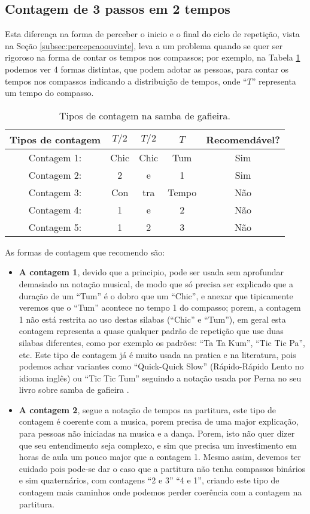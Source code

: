 \subsection{Contagem de 3 passos em 2 tempos}
Esta diferença na forma de perceber o inicio e o final do ciclo de repetição,
vista na Seção \ref{subsec:percepcaoouvinte}, 
leva a um problema quando se quer ser rigoroso na forma de contar os tempos nos compassos; 
por exemplo, na Tabela \ref{tab:ritmo1} 
podemos ver 4 formas distintas, que podem adotar as pessoas, 
para contar os tempos nos compassos indicando a distribuição de tempos, 
onde ``$T$'' representa um tempo do compasso.
\begin{table}[ht]
  \centering
  \begin{tabular}    {c|ccc|c}
    \hline
    Tipos de contagem       & $T/2$ & $T/2$   & $T$ & Recomendável?\\
    \hline
    Contagem 1: & Chic  & Chic  & Tum   & Sim\\
    Contagem 2: & 2     & e     & 1     & Sim\\ \hline
    Contagem 3: & Con   & tra  & Tempo & Não\\
    Contagem 4: & 1     & e     & 2     & Não\\
    Contagem 5: & 1     & 2     & 3     & Não\\
    \hline
  \end{tabular}
  \caption{Tipos de contagem na samba de gafieira.}
\label{tab:ritmo1}
\end{table}

As formas de contagem que recomendo são:
\begin{itemize}
\item \textbf{A contagem 1}, 
devido que a principio, pode ser usada sem aprofundar demasiado 
na notação musical, de modo que só precisa ser explicado que a duração de um 
``Tum'' é o dobro que um ``Chic'', e anexar que tipicamente veremos que o ``Tum''
acontece no tempo 1 do compasso; 
porem, a contagem 1 não está restrita ao uso destas silabas (``Chic'' e ``Tum''), 
em geral esta contagem representa a quase qualquer padrão de repetição
que use duas silabas diferentes, como por exemplo os padrões: ``Ta Ta Kum'', ``Tic Tic Pa'', etc. 
Este tipo de contagem já é muito usada na pratica e na literatura, pois 
podemos achar variantes como ``Quick-Quick Slow'' (Rápido-Rápido Lento no idioma inglês)
ou ``Tic Tic Tum'' seguindo a notação usada por Perna no seu livro sobre samba de gafieira \cite[pp. 146]{perna2002samba}.
\item \textbf{A contagem 2}, segue a notação de tempos na partitura, este tipo de
contagem é coerente com a musica, porem precisa de uma major explicação, 
para pessoas não iniciadas na musica e a dança. Porem, isto não quer dizer que seu
entendimento seja complexo, e sim que precisa um investimento em horas de aula
um pouco major que a contagem 1.
Mesmo assim, devemos ter cuidado pois pode-se dar o caso que a partitura não tenha compassos binários 
e sim quaternários, com contagens ``2 e 3'' ``4 e 1'', 
criando este tipo de contagem mais caminhos onde podemos perder coerência com a contagem na partitura.
\end{itemize}


